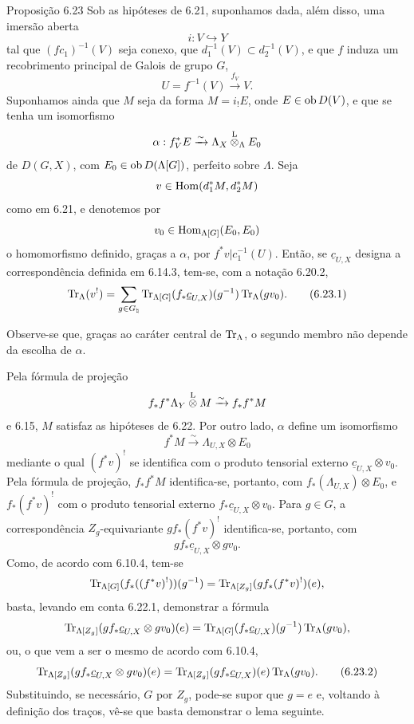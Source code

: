\begin{statement}{Proposição 6.23}
Sob as hipóteses de 6.21, suponhamos dada, além disso, uma imersão aberta
\[
i:V\hookrightarrow Y
\]
tal que $(fc_1)^{-1}(V)$ seja conexo, que $d_1^{-1}(V)\subset d_2^{-1}(V)$, e que $f$ induza um recobrimento principal de Galois de grupo $G$,
\[
U=f^{-1}(V)\xrightarrow{f_V}V.
\]
Suponhamos ainda que $M$ seja da forma $M=i_!E$, onde $E\in\operatorname{ob} D(V)$, e que se tenha um isomorfismo
\[
\alpha:f_V^*E\xrightarrow{\sim}\Lambda_X\overset{\mathrm L}{\otimes}_{\Lambda}E_0
\]
de $D(G,X)$, com $E_0\in\operatorname{ob} D(\Lambda[G])$, perfeito sobre $\Lambda$. Seja
\[
v\in\operatorname{Hom}(d_1^*M,d_2^*M)
\]
como em 6.21, e denotemos por
\[
v_0\in\operatorname{Hom}_{\Lambda[G]}(E_0,E_0)
\]
o homomorfismo definido, graças a $\alpha$, por $f^*v|c_1^{-1}(U)$. Então, se $\underline c_{U,X}$ designa a correspondência definida em 6.14.3, tem-se, com a notação 6.20.2,
\begin{equation}
\operatorname{Tr}_{\Lambda}(v^!)
=
\sum_{g\in G_{\natural}}
\operatorname{Tr}_{\Lambda[G]}(f_*\underline c_{U,X})(g^{-1})\operatorname{Tr}_{\Lambda}(gv_0).
\tag{6.23.1}
\end{equation}
\end{statement}

Observe-se que, graças ao caráter central de $\operatorname{Tr}_{\Lambda}$, o segundo membro não depende da escolha de $\alpha$.

Pela fórmula de projeção
\[
f_*f^*\Lambda_Y\overset{\mathrm L}{\otimes} M\xrightarrow{\sim}f_*f^*M
\]
e 6.15, $M$ satisfaz as hipóteses de 6.22. Por outro lado, $\alpha$ define um isomorfismo
\[
f^*M\xrightarrow{\sim}\Lambda_{U,X}\otimes E_0
\]
mediante o qual $(f^*v)^!$ se identifica com o produto tensorial externo $\underline c_{U,X}\otimes v_0$. Pela fórmula de projeção, $f_*f^*M$ identifica-se, portanto, com $f_*(\Lambda_{U,X})\otimes E_0$, e $f_*(f^*v)^!$ com o produto tensorial externo $f_*\underline c_{U,X}\otimes v_0$. Para $g\in G$, a correspondência $Z_g$-equivariante $gf_*(f^*v)^!$ identifica-se, portanto, com
\[
gf_*\underline c_{U,X}\otimes gv_0.
\]
Como, de acordo com 6.10.4, tem-se
\[
\operatorname{Tr}_{\Lambda[G]}(f_*((f^*v)^!))(g^{-1})
=
\operatorname{Tr}_{\Lambda[Z_g]}(gf_*(f^*v)^!)(e),
\]
basta, levando em conta 6.22.1, demonstrar a fórmula
\[
\operatorname{Tr}_{\Lambda[Z_g]}(gf_*\underline c_{U,X}\otimes gv_0)(e)
=
\operatorname{Tr}_{\Lambda[G]}(f_*\underline c_{U,X})(g^{-1})\operatorname{Tr}_{\Lambda}(gv_0),
\]
ou, o que vem a ser o mesmo de acordo com 6.10.4,
\begin{equation}
\operatorname{Tr}_{\Lambda[Z_g]}(gf_*\underline c_{U,X}\otimes gv_0)(e)
=
\operatorname{Tr}_{\Lambda[Z_g]}(gf_*\underline c_{U,X})(e)\operatorname{Tr}_{\Lambda}(gv_0).
\tag{6.23.2}
\end{equation}
Substituindo, se necessário, $G$ por $Z_g$, pode-se supor que $g=e$ e, voltando à definição dos traços, vê-se que basta demonstrar o lema seguinte.
